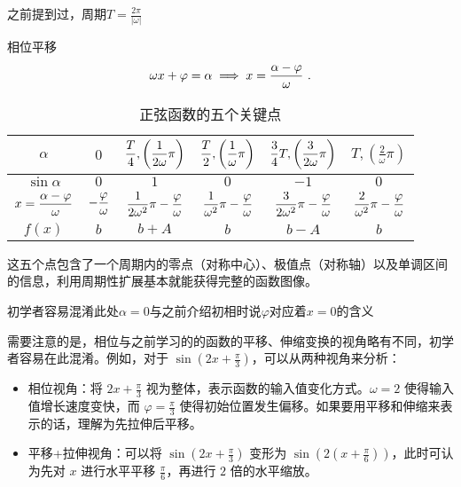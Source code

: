 之前提到过，周期$\displaystyle T = \frac{2\pi}{|\omega|}$

相位平移
\begin{equation}
\omega x + \varphi=\alpha\implies x={\alpha-\varphi\over \omega}~.
\end{equation}

\begin{table}[ht]
\centering
\caption{正弦函数的五个关键点}\label{tab_HsSinF1}
\begin{tabular}{|c|c|c|c|c|c|}
\hline
$\alpha$ & $0$ &$\displaystyle {T\over4},\left(\frac{1}{2\omega}\pi\right)$& $\displaystyle {T\over2},\left(\frac{1}{\omega}\pi\right)$ & $\displaystyle {3\over4}T,\left(\frac{3}{2\omega}\pi\right)$ & $\displaystyle T,\left(\frac{2}{\omega}\pi\right)$\\
\hline
$\sin \alpha$ & $0$&$1$&$0$&$-1$&$0$ \\
\hline
$x=\displaystyle{\alpha-\varphi\over \omega}$&$\displaystyle-{\varphi\over \omega}$&$\displaystyle{1\over 2\omega^2}\pi-{\varphi\over \omega}$&$\displaystyle{1\over \omega^2}\pi-{\varphi\over \omega}$&$\displaystyle{3\over 2\omega^2}\pi-{\varphi\over \omega}$&$\displaystyle{2\over \omega^2}\pi-{\varphi\over \omega}$\\
\hline
$f(x)$ & $b$&$b+A$&$b$&$b-A$&$b$ \\
\hline
\end{tabular}
\end{table}
这五个点包含了一个周期内的零点（对称中心）、极值点（对称轴）以及单调区间的信息，利用周期性扩展基本就能获得完整的函数图像。


初学者容易混淆此处$\alpha=0$与之前介绍初相时说$\varphi$对应着$x=0$的含义


需要注意的是，相位与之前学习的的函数的平移、伸缩变换的视角略有不同，初学者容易在此混淆。例如，对于 $\displaystyle\sin(2x + \frac{\pi}{3})$，可以从两种视角来分析：
\begin{itemize}
\item 相位视角：将 $\displaystyle2x + \frac{\pi}{3}$ 视为整体，表示函数的输入值变化方式。$\omega = 2$ 使得输入值增长速度变快，而 $\displaystyle\varphi = \frac{\pi}{3}$ 使得初始位置发生偏移。如果要用平移和伸缩来表示的话，理解为先拉伸后平移。
\item 平移+拉伸视角：可以将 $\displaystyle\sin(2x + \frac{\pi}{3})$ 变形为 $\displaystyle\sin\left(2(x + \frac{\pi}{6})\right)$，此时可认为先对 $x$ 进行水平平移 $\displaystyle\frac{\pi}{6}$，再进行 $2$ 倍的水平缩放。
\end{itemize}

